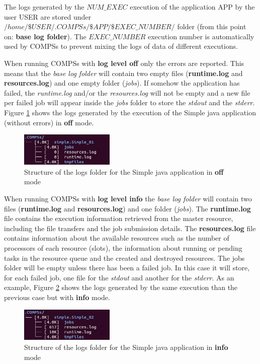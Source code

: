 The logs generated by the $NUM\_EXEC$ execution of the application APP by the user USER are stored under
\textit{$/home/\$USER/.COMPSs/\$APP/\$EXEC\_NUMBER/$} folder (from this point on: \textbf{base log folder}). The $EXEC\_NUMBER$ execution number is 
automatically used by COMPSs to prevent mixing the logs of data of different executions. 

When running COMPSs with \textbf{log level off} only the errors are reported. This means that the \textit{base log folder} will 
contain two empty files (\textbf{runtime.log} and \textbf{resources.log}) and one empty folder (\textit{jobs}). If somehow the 
application has failed, the \textit{runtime.log} and/or the \textit{resources.log} will not be empty and a new file per 
failed job will appear inside the \textit{jobs} folder to store the \textit{stdout} and the \textit{stderr}. 
Figure \ref{fig:simple_log_off} shows the logs generated by the execution of the Simple java application (without errors) 
in \textbf{off} mode. 
\begin{figure}[h!]
  \centering
    \includegraphics[width=0.4\textwidth]{./Sections/3_Results_and_Logs/Figures/simple_log_off.jpeg}
    \caption{Structure of the logs folder for the Simple java application in \textbf{off} mode}
    \label{fig:simple_log_off}
\end{figure}

When running COMPSs with \textbf{log level info} the \textit{base log folder} will contain two files (\textbf{runtime.log} and 
\textbf{resources.log}) and one folder (\textit{jobs}). The \textbf{runtime.log} file contains the execution information retrieved 
from the master resource, including the file transfers and the job submission details. The \textbf{resources.log} file contains 
information about the available resources such as the number of processors of each resource (slots), the information about running or 
pending tasks in the resource queue and the created and destroyed resources. The jobs folder will be empty unless there has been a
failed job. In this case it will store, for each failed job, one file for the \textit{stdout} and another for the \textit{stderr}.
As an example, Figure \ref{fig:simple_log_info} shows the logs generated by the same execution than the previous case 
but with \textbf{info} mode. 
\begin{figure}[h!]
  \centering
    \includegraphics[width=0.4\textwidth]{./Sections/3_Results_and_Logs/Figures/simple_log_info.jpeg}
    \caption{Structure of the logs folder for the Simple java application in \textbf{info} mode}
    \label{fig:simple_log_info}
\end{figure}

